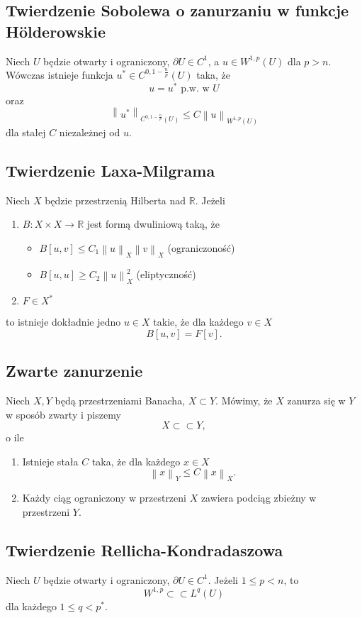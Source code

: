 \documentclass[letterpaper,12pt]{article}
\newcommand{\norm}[1]{\left\lVert#1\right\rVert}
\newcommand{\R}{\mathbb{R}}
\renewcommand{\leq}{\leqslant}
\renewcommand{\geq}{\geqslant}
\begin{document}
\subsection{Twierdzenie Sobolewa o zanurzaniu w funkcje H\"olderowskie}
Niech $U$ będzie otwarty i ograniczony, $\partial U \in C^1$, a $u \in W^{1,p}(U)$ dla $p > n$.
Wówczas istnieje funkcja $u^* \in C^{0, 1-\frac{n}{p}}(U)$ taka, że 
$$ u = u^* \text{ p.w. w } U$$
oraz
$$\norm{u^*}_{C^{0, 1-\frac{n}{p}}(U)} \leq C \norm{u}_{W^{1,p}(U)}$$
dla stałej $C$ niezależnej od $u$.

\subsection{Twierdzenie Laxa-Milgrama}
Niech $X$ będzie przestrzenią Hilberta nad $\R$. Jeżeli
\begin{enumerate}
    \item $B: X \times X \to \R$ jest formą dwuliniową taką, że 
    \begin{itemize}
        \item $B[u,v] \leq C_1 \norm{u}_X \norm{v}_X$ (ograniczoność)
        \item $B[u,u] \geq C_2 \norm{u}^2_X$ (eliptyczność)
    \end{itemize}
    \item $F \in X^*$
\end{enumerate}
to istnieje dokładnie jedno $u \in X$ takie, że dla każdego $v \in X$
$$ B[u,v] = F[v].$$

\subsection{Zwarte zanurzenie}
Niech $X, Y$ będą przestrzeniami Banacha, $X \subset Y$. Mówimy, że $X$ zanurza się w $Y$ w sposób zwarty i piszemy
$$ X \subset \subset Y, $$
o ile
\begin{enumerate}
    \item Istnieje stała $C$ taka, że dla każdego $x \in X$
    $$ \norm{x}_Y \leq C \norm{x}_X. $$
    \item Każdy ciąg ograniczony w przestrzeni $X$ zawiera podciąg zbieżny w przestrzeni $Y$.
\end{enumerate} 

\subsection{Twierdzenie Rellicha-Kondradaszowa}
Niech $U$ będzie otwarty i ograniczony, $\partial U \in C^1$. Jeżeli $1 \leq p < n$, to
$$ W^{1,p} \subset \subset L^q(U) $$
dla każdego $1 \leq q < p^*$.
\end{document}
